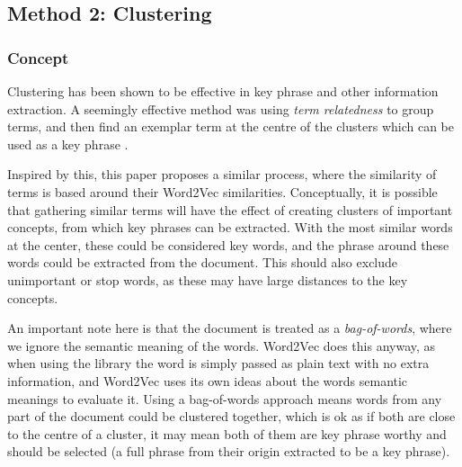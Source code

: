 \subsection{Method 2: Clustering}
\subsubsection*{Concept}
Clustering has been shown to be effective in key phrase and other information extraction. A seemingly effective method was using \textit{term relatedness} to group terms, and then find an exemplar term at the centre of the clusters which can be used as a key phrase \cite{Liu2009}. 

Inspired by this, this paper proposes a similar process, where the similarity of terms is based around their Word2Vec similarities. Conceptually, it is possible that gathering similar terms will have the effect of creating clusters of important concepts, from which key phrases can be extracted. With the most similar words at the center, these could be considered key words, and the phrase around these words could be extracted from the document. This should also exclude unimportant or stop words, as these may have large distances to the key concepts. 

An important note here is that the document is treated as a \textit{bag-of-words}, where we ignore the semantic meaning of the words. Word2Vec does this anyway, as when using the library the word is simply passed as plain text with no extra information, and Word2Vec uses its own ideas about the words semantic meanings to evaluate it. Using a bag-of-words approach means words from any part of the document could be clustered together, which is ok as if both are close to the centre of a cluster, it may mean both of them are key phrase worthy and should be selected (a full phrase from their origin extracted to be a key phrase).

